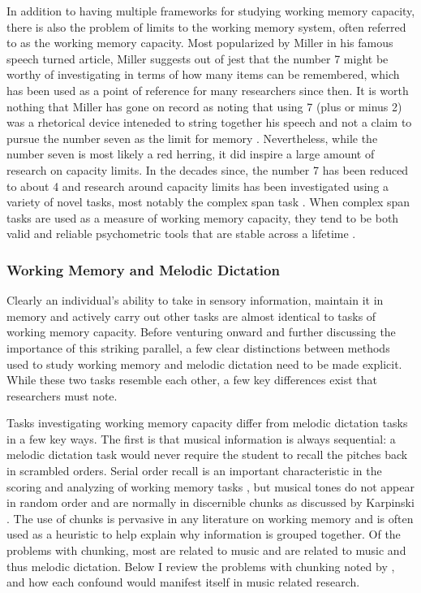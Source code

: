 \documentclass[12pt,]{book}
\begin{document}
In addition to having multiple frameworks for studying working memory capacity, there is also the problem of limits to the working memory system, often referred to as the working memory capacity.
Most popularized by Miller in his famous \citep{millerMagicalNumberSeven1956} speech turned article, Miller suggests out of jest that the number 7 might be worthy of investigating in terms of how many items can be remembered, which has been used as a point of reference for many researchers since then.
It is worth nothing that Miller has gone on record as noting that using 7 (plus or minus 2) was a rhetorical device inteneded to string together his speech and not a claim to pursue the number seven as the limit for memory \citep{millerHistoryPsychologyAutobiography1989}.
Nevertheless, while the number seven is most likely a red herring, it did inspire a large amount of research on capacity limits.
In the decades since, the number 7 has been reduced to about 4 \citep{cowanMagicalMysteryFour2010} and research around capacity limits has been investigated using a variety of novel tasks, most notably the complex span task \citep{unsworthAutomatedVersionOperation2005, unsworthComplexWorkingMemory2009}.
When complex span tasks are used as a measure of working memory capacity, they tend to be both valid and reliable psychometric tools that are stable across a lifetime \citep{unsworthAutomatedVersionOperation2005}.

\hypertarget{working-memory-and-melodic-dictation}{%
\subsubsection{Working Memory and Melodic Dictation}\label{working-memory-and-melodic-dictation}}

Clearly an individual's ability to take in sensory information, maintain it in memory and actively carry out other tasks are almost identical to tasks of working memory capacity.
Before venturing onward and further discussing the importance of this striking parallel, a few clear distinctions between methods used to study working memory and melodic dictation need to be made explicit.
While these two tasks resemble each other, a few key differences exist that researchers must note.

Tasks investigating working memory capacity differ from melodic dictation tasks in a few key ways.
The first is that musical information is always sequential: a melodic dictation task would never require the student to recall the pitches back in scrambled orders.
Serial order recall is an important characteristic in the scoring and analyzing of working memory tasks \citep{conwayWorkingMemorySpan2005}, but musical tones do not appear in random order and are normally in discernible chunks as discussed by Karpinski \citep{karpinskiAuralSkillsAcquisition2000}.
The use of chunks is pervasive in any literature on working memory and is often used as a heuristic to help explain why information is grouped together.
Of the problems with chunking, most are related to music and are related to music and thus melodic dictation.
Below I review the problems with chunking noted by \citet{cowanWorkingMemoryCapacity2005}, and how each confound would manifest itself in music related research.
\end{document}
